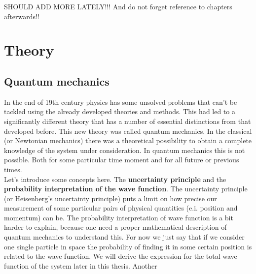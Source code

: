 \documentclass[twoside,english]{uiofysmaster}
\theoremstyle{definition}
\begin{document}
	SHOULD ADD MORE LATELY!!! And do not forget reference to chapters afterwards!!
	
\part{Theory}
\chapter{Quantum mechanics}
In the end of 19th century physics has some unsolved problems that can't be tackled using the already developed theories and methods. This had led to a  significantly different theory that has a number of essential distinctions  from that developed before. This new theory was called quantum mechanics. In the classical (or Newtonian mechanics) there was a theoretical possibility to obtain a complete knowledge of the system under consideration. In quantum mechanics this is not possible. Both for some particular time moment and for all future or previous times. \\
Let's introduce some concepts here. The \textbf{uncertainty principle} and the \textbf{probability interpretation of the wave function}. The  uncertainty principle (or Heisenberg's uncertainty principle) puts a limit on how precise our measurement of some particular pairs of physical quantities (e.i. position and momentum) can be. The probability interpretation of wave function is a bit harder to explain, because one need a proper mathematical description of quantum mechanics to understand this. For now we just say that if we consider one single particle in space the probability of finding it in some certain position is related to the wave function. We will derive the expression for the total wave function of the system later in this thesis. Another 
\end{document}
